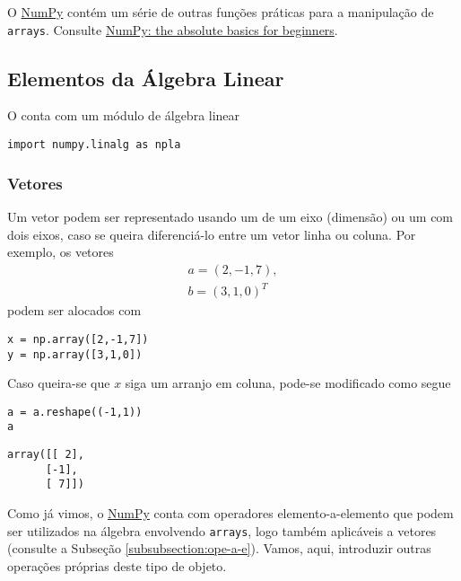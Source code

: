 \documentclass[12pt]{article}
\begin{document}
 
\begin{obs}
O \href{https://numpy.org/}{NumPy} contém um série de outras funções práticas para a manipulação de \lstinline+arrays+. Consulte \href{https://numpy.org/doc/stable/user/absolute_beginners.html\#numpy-the-absolute-basics-for-beginners}{NumPy: the absolute basics for beginners}.  
\end{obs}

\subsection{Elementos da Álgebra Linear}

O {\PYTHONnumpy} conta com um módulo de álgebra linear

\begin{lstlisting}
import numpy.linalg as npla
\end{lstlisting}

\subsubsection{Vetores}

Um vetor podem ser representado usando um {\PYTHONnumpyDOTarray} de um eixo (dimensão) ou um com dois eixos, caso se queira diferenciá-lo entre um vetor linha ou coluna. Por exemplo, os vetores
\begin{gather}
  a = (2, -1, 7),\\
  b = (3, 1, 0)^T
\end{gather}
podem ser alocados com

\begin{lstlisting}
x = np.array([2,-1,7])
y = np.array([3,1,0])
\end{lstlisting}

Caso queira-se que $x$ siga um arranjo em coluna, pode-se modificado como segue

\begin{lstlisting}
a = a.reshape((-1,1))
a
\end{lstlisting}

\begin{verbatim}
array([[ 2],
      [-1],
      [ 7]])
\end{verbatim}

Como já vimos, o \href{https://numpy.org/}{NumPy} conta com operadores elemento-a-elemento que podem ser utilizados na álgebra envolvendo \lstinline+arrays+, logo também aplicáveis a vetores (consulte a Subseção \ref{subsubsection:ope-a-e}). Vamos, aqui, introduzir outras operações próprias deste tipo de objeto.
\end{document}
